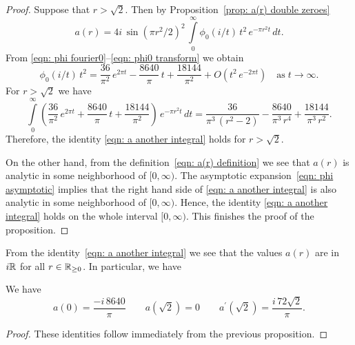   \begin{proof}
  Suppose that $r>\sqrt{2}$. Then by Proposition~\ref{prop: a(r) double zeroes}
  $$a(r)=4i\,\sin(\pi r^2/2)^2\,\int\limits_{0}^{\infty}\phi_0(i/t)\,t^2\,e^{-\pi r^2 t}\,dt. $$
  From \eqref{eqn: phi fourier0}--\eqref{eqn: phi0 transform} we obtain
  \begin{equation}\label{eqn: phi asymptotic}
  \phi_0(i/t)\,t^2=\frac{36}{\pi^2}\,e^{2 \pi t}-\frac{8640}{\pi}\,t+\frac{18144}{\pi^2}+O(t^2\,e^{-2\pi t})\quad\mbox{as}\;t\to\infty.
  \end{equation}
  For $r>\sqrt{2}$ we have
  \begin{equation}
  \int\limits_0^\infty \left(\frac{36}{\pi^2}\,e^{2 \pi t}+\frac{8640}{\pi}\,t+\frac{18144}{\pi^2}\right)\,e^{-\pi r^2 t}\,dt
  =\frac{36}{\pi^3\,(r^2-2)}-\frac{8640}{\pi^3\,r^4}+\frac{18144}{\pi^3\,r^2}.\end{equation}
  Therefore, the identity \eqref{eqn: a another integral} holds for $r>\sqrt{2}$.

  On the other hand, from the definition~\eqref{eqn: a(r) definition} we see that $a(r)$ is analytic in some neighborhood of $[0,\infty)$. The asymptotic expansion~\eqref{eqn: phi asymptotic} implies that the right hand side of \eqref{eqn: a another integral} is also analytic in some neighborhood of $[0,\infty)$. Hence, the identity \eqref{eqn: a another integral} holds on the whole interval $[0,\infty)$. This finishes the proof of the proposition.
  \end{proof}
  From the identity~\eqref{eqn: a another integral} we see that the values $a(r)$ are in $i\mathbb{R}$ for all $r\in\mathbb{R}_{\geq0}$. In particular, we have
  \begin{proposition}\label{prop: a values}
  We have
  \begin{equation}
  a(0)=\frac{-i\,8640}{\pi}\qquad
  a(\sqrt{2})=0\qquad
  a^\prime(\sqrt{2})=\frac{i\,72\sqrt{2}}{\pi}.
  \end{equation}
  \end{proposition}
  \begin{proof}
  These identities follow immediately from the previous proposition.
  \end{proof}

